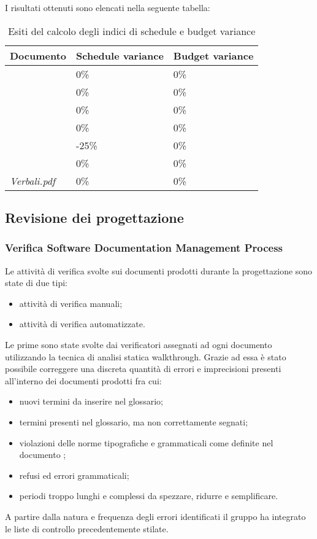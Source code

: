 		I risultati ottenuti sono elencati nella seguente tabella:	
		\begin{table}[H]
		\begin{tabular}{|l|l|l|}
		\hline
		\textbf{Documento} 		&\textbf{Schedule variance} &\textbf{Budget variance} \\
		\hline
		\PdQ 					&0\%		&0\%\\
		\NdP 					&0\%		&0\%\\
		\SdF 					&0\%		&0\%\\
		\AdR 					&0\%		&0\%\\
		\PdP 					&-25\%		&0\%\\
		\Glossario 				&0\%		&0\%\\
		\textit{Verbali.pdf} 	&0\%		&0\%\\
		\hline
		\end{tabular}
		\caption{Esiti del calcolo degli indici di schedule e budget variance}
		\end{table}


	\subsection{Revisione dei progettazione}
		\subsubsection{Verifica Software Documentation Management Process}
		Le attività di verifica svolte sui documenti prodotti durante la progettazione sono state di due tipi:
		\begin{itemize}		
			\item attività di verifica manuali;
			\item attività di verifica automatizzate.
		\end{itemize}
		
		Le prime sono state svolte dai verificatori assegnati ad ogni documento utilizzando la tecnica di 					analisi statica walkthrough. Grazie ad essa è stato possibile correggere una discreta quantità di errori e imprecisioni presenti all'interno dei documenti prodotti fra cui: 
		\begin{itemize}	
			\item nuovi termini da inserire nel glossario;
			\item termini presenti nel glossario, ma non correttamente segnati;
			\item violazioni delle norme tipografiche e grammaticali come definite nel documento \NdP;
			\item refusi ed errori grammaticali;
			\item periodi troppo lunghi e complessi da spezzare, ridurre e semplificare.
		\end{itemize}
		A partire dalla natura e frequenza degli errori identificati il gruppo ha integrato le liste di controllo precedentemente stilate.

